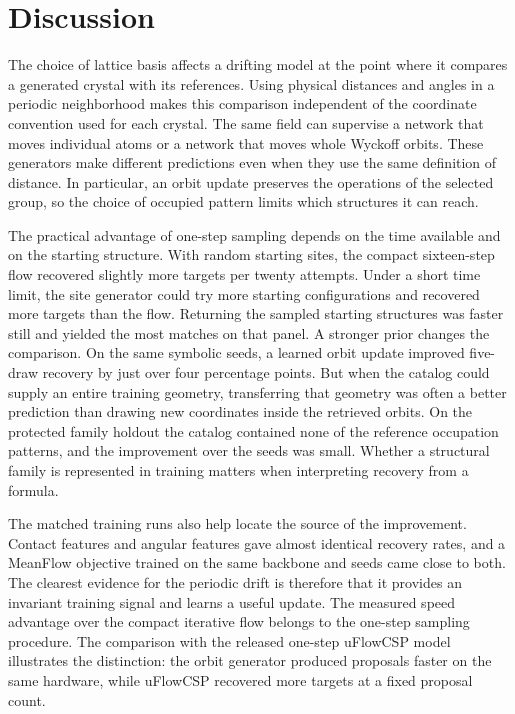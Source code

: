 \section{Discussion}

The choice of lattice basis affects a drifting model at the point where it compares a generated crystal with its references. Using physical distances and angles in a periodic neighborhood makes this comparison independent of the coordinate convention used for each crystal. The same field can supervise a network that moves individual atoms or a network that moves whole Wyckoff orbits. These generators make different predictions even when they use the same definition of distance. In particular, an orbit update preserves the operations of the selected group, so the choice of occupied pattern limits which structures it can reach.

The practical advantage of one-step sampling depends on the time available and on the starting structure. With random starting sites, the compact sixteen-step flow recovered slightly more targets per twenty attempts. Under a short time limit, the site generator could try more starting configurations and recovered more targets than the flow. Returning the sampled starting structures was faster still and yielded the most matches on that panel. A stronger prior changes the comparison. On the same symbolic seeds, a learned orbit update improved five-draw recovery by just over four percentage points. But when the catalog could supply an entire training geometry, transferring that geometry was often a better prediction than drawing new coordinates inside the retrieved orbits. On the protected family holdout the catalog contained none of the reference occupation patterns, and the improvement over the seeds was small. Whether a structural family is represented in training matters when interpreting recovery from a formula.

The matched training runs also help locate the source of the improvement. Contact features and angular features gave almost identical recovery rates, and a MeanFlow objective trained on the same backbone and seeds came close to both. The clearest evidence for the periodic drift is therefore that it provides an invariant training signal and learns a useful update. The measured speed advantage over the compact iterative flow belongs to the one-step sampling procedure. The comparison with the released one-step uFlowCSP model illustrates the distinction: the orbit generator produced proposals faster on the same hardware, while uFlowCSP recovered more targets at a fixed proposal count.

